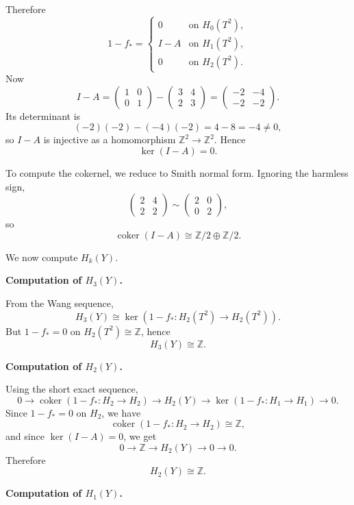 \begin{solution}
Therefore
\[
1-f_*=
\begin{cases}
	0 & \text{on }H_0(T^2),\\[1ex]
	I-A & \text{on }H_1(T^2),\\[1ex]
	0 & \text{on }H_2(T^2).
\end{cases}
\]
Now
\[
I-A=
\begin{pmatrix}
	1&0\\
	0&1
\end{pmatrix}
-
\begin{pmatrix}
	3&4\\
	2&3
\end{pmatrix}
=
\begin{pmatrix}
	-2&-4\\
	-2&-2
\end{pmatrix}.
\]
Its determinant is
\[
(-2)(-2)-(-4)(-2)=4-8=-4\neq 0,
\]
so \(I-A\) is injective as a homomorphism \(\mathbb Z^2\to \mathbb Z^2\). Hence
\[
\ker(I-A)=0.
\]

To compute the cokernel, we reduce to Smith normal form. Ignoring the harmless sign,
\[
\begin{pmatrix}
	2&4\\
	2&2
\end{pmatrix}
\sim
\begin{pmatrix}
	2&0\\
	0&2
\end{pmatrix},
\]
so
\[
\operatorname{coker}(I-A)\cong \mathbb Z/2\oplus \mathbb Z/2.
\]

We now compute \(H_k(Y)\).


\medskip
\noindent\textbf{Computation of \(H_3(Y)\).}\par
\smallskip

From the Wang sequence,
\[
H_3(Y)\cong \ker(1-f_*:H_2(T^2)\to H_2(T^2)).
\]
But \(1-f_*=0\) on \(H_2(T^2)\cong \mathbb Z\), hence
\[
H_3(Y)\cong \mathbb Z.
\]


\medskip
\noindent\textbf{Computation of \(H_2(Y)\).}\par
\smallskip

Using the short exact sequence,
\[
0\to \operatorname{coker}(1-f_*:H_2\to H_2)\to H_2(Y)\to \ker(1-f_*:H_1\to H_1)\to 0.
\]
Since \(1-f_*=0\) on \(H_2\), we have
\[
\operatorname{coker}(1-f_*:H_2\to H_2)\cong \mathbb Z,
\]
and since \(\ker(I-A)=0\), we get
\[
0\to \mathbb Z\to H_2(Y)\to 0\to 0.
\]
Therefore
\[
H_2(Y)\cong \mathbb Z.
\]


\medskip
\noindent\textbf{Computation of \(H_1(Y)\).}\par
\smallskip


\end{solution}
